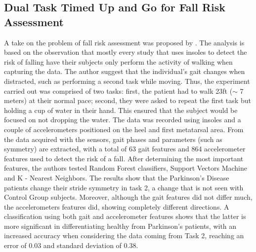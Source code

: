\subsection{Dual Task Timed Up and Go for Fall Risk Assessment}
A take on the problem of fall risk assessment was proposed by \cite{ParkinsonCupOWater}. The analysis is based on the observation that mostly every study that uses insoles to detect the risk of falling have their subjects only perform the activity of walking when capturing the data. The author suggest that the individual's gait changes when distracted, such as performing a second task while moving. 
Thus, the experiment carried out was comprised of two tasks: first, the patient had to walk 23ft ($\sim$ 7 meters) at their normal pace; second, they were asked to repeat the first task but holding a cup of water in their hand. This ensured that the subject would be focused on not dropping the water.
The data was recorded using insoles and a couple of accelerometers positioned on the heel and first metatarsal area. 
From the data acquired with the sensors, gait phases and parameters (such as symmetry) are extracted, with a total of 63 gait features and 864 accelerometer features used to detect the risk of a fall. After determining the most important features, the authors tested Random Forest classifiers, Support Vectors Machine and K - Nearest Neighbors.
The results show that the Parkinson's Disease patients change their stride symmetry in task 2, a change that is not seen with Control Group subjects.
Moreover, although the gait features did not differ much, the accelerometers features did, showing completely different directions. A classification using both gait and accelerometer features shows that the latter is more significant in differentiating healthy from Parkinson's patients, with an increased accuracy when considering the data coming from Task 2, reaching an error of 0.03 and standard deviation of 0.38. 

